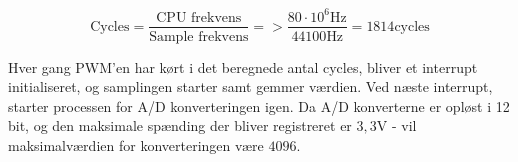 \begin {equation}
\text{Cycles} = \frac{\text{CPU frekvens}}{\text{Sample frekvens}} => \frac{80\cdot 10^6\si\hertz}{44100\si\hertz} = 1814 \text{cycles}
\end {equation}

Hver gang PWM'en har kørt i det beregnede antal cycles, bliver et interrupt initialiseret, og samplingen starter samt gemmer værdien. Ved næste interrupt, starter processen for A/D konverteringen igen.
Da A/D konverterne er opløst i 12 bit, og den maksimale spænding der bliver registreret er $3,3\si\volt$ - vil maksimalværdien for konverteringen være $4096$. 